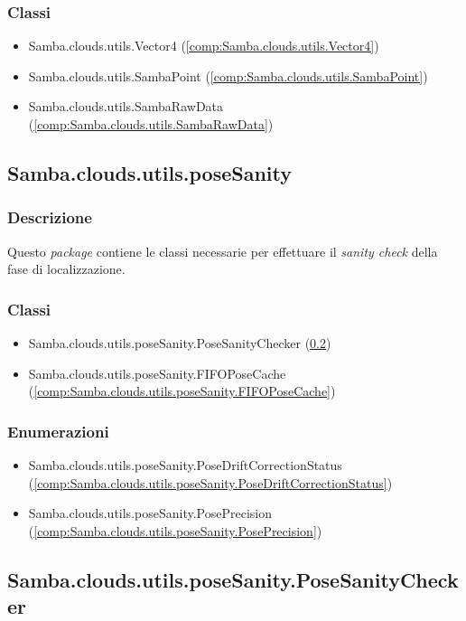 \subsubsection{Classi}
\begin{itemize}
	\item Samba.clouds.utils.Vector4 (\ref{comp:Samba.clouds.utils.Vector4})
	\item Samba.clouds.utils.SambaPoint (\ref{comp:Samba.clouds.utils.SambaPoint})
	\item Samba.clouds.utils.SambaRawData (\ref{comp:Samba.clouds.utils.SambaRawData})
\end{itemize}

\subsection{Samba.clouds.utils.poseSanity} \label{comp:Samba.clouds.utils.poseSanity}
\subsubsection{Descrizione}
Questo \emph{package} contiene le classi necessarie per effettuare il \emph{sanity check} della fase di localizzazione.
\subsubsection{Classi}
\begin{itemize}
	\item Samba.clouds.utils.poseSanity.PoseSanityChecker (\ref{comp:Samba.clouds.utils.poseSanity.PoseSanityChecker})
	\item Samba.clouds.utils.poseSanity.FIFOPoseCache (\ref{comp:Samba.clouds.utils.poseSanity.FIFOPoseCache})
\end{itemize}
\subsubsection{Enumerazioni}
\begin{itemize}
	\item Samba.clouds.utils.poseSanity.PoseDriftCorrectionStatus (\ref{comp:Samba.clouds.utils.poseSanity.PoseDriftCorrectionStatus})
	\item Samba.clouds.utils.poseSanity.PosePrecision (\ref{comp:Samba.clouds.utils.poseSanity.PosePrecision})
\end{itemize}

\subsection{Samba.clouds.utils.poseSanity.PoseSanityChecker} \label{comp:Samba.clouds.utils.poseSanity.PoseSanityChecker}
\label{class:PoseSanityChecker}
